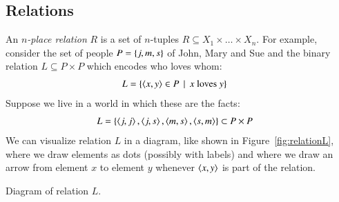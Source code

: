 \documentclass[nobib,nofonts]{tufte-handout}
\begin{document}
\subsection{Relations}

An \emph{$n$-place relation} $R$ is a set of $n$-tuples
$R \subseteq X_1 \times \dots \times X_n$.
For example, consider the set of people $P = \left\{j,m,s\right\}$ of John, Mary and Sue and the binary relation $L \subseteq P \times P$ which encodes who loves whom:
\begin{align*}
  L & = \left\{\left \langle x,y\right\rangle \in P \thinspace \mid \thinspace \text{$x$ loves $y$}\right\}
\end{align*}
Suppose we live in a world in which these are the facts:
\begin{align*}
  L  & = \left\{\left \langle j,j\right\rangle, \left \langle j,s\right\rangle, \left \langle m,s\right\rangle, \left \langle s,m\right\rangle\right\} \subset P \times P
\end{align*}
\noindent We can visualize relation $L$ in a diagram, like shown in Figure~\ref{fig:relationL}, where we
draw elements as dots (possibly with labels) and where we draw an arrow from element $x$ to
element $y$ whenever $\left \langle x,y\right\rangle$ is part of the relation.
\begin{marginfigure}
\caption{Diagram of relation $L$.}
\label{fig:relationL}
\end{marginfigure}
\end{document}
